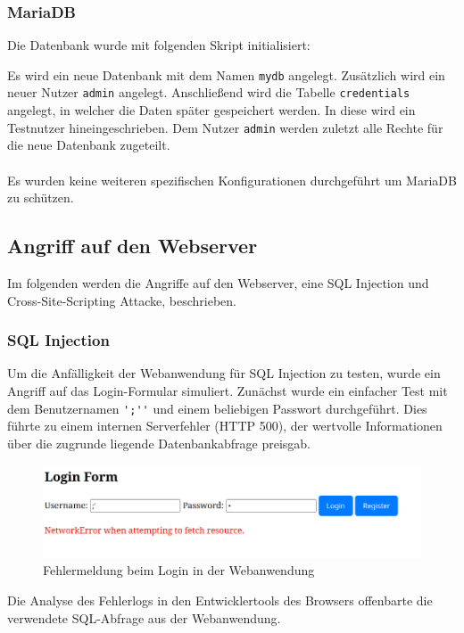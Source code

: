 \documentclass[
    a4paper,
    pagesize,
	pdftex,
    12pt,
]{scrartcl}
\begin{document}
\subsubsection{MariaDB}
Die Datenbank wurde mit folgenden Skript initialisiert:

Es wird ein neue Datenbank mit dem Namen \lstinline[breaklines]|mydb| angelegt. Zusätzlich wird ein neuer Nutzer \lstinline[breaklines]|admin| angelegt. Anschließend wird die Tabelle \lstinline[breaklines]|credentials| angelegt, in welcher die Daten später gespeichert werden. In diese wird ein Testnutzer hineingeschrieben. Dem Nutzer \lstinline[breaklines]|admin| werden zuletzt alle Rechte für die neue Datenbank zugeteilt. \\ \\
Es wurden keine weiteren spezifischen Konfigurationen durchgeführt um MariaDB zu schützen.

\subsection{Angriff auf den Webserver}
Im folgenden werden die Angriffe auf den Webserver, eine SQL Injection und Cross-Site-Scripting Attacke, beschrieben.

\subsubsection{SQL Injection}
Um die Anfälligkeit der Webanwendung für SQL Injection zu testen, wurde ein Angriff auf das Login-Formular simuliert. Zunächst wurde ein einfacher Test mit dem Benutzernamen \lstinline[breaklines]|';''| und einem beliebigen Passwort durchgeführt. Dies führte zu einem internen Serverfehler (HTTP 500), der wertvolle Informationen über die zugrunde liegende Datenbankabfrage preisgab.

\begin{figure}[H]
	\centering
	\includegraphics[width=15cm]{sql-login-error-message.png}
	\caption{Fehlermeldung beim Login in der Webanwendung}
	\label{fig:sql-login-error-message}
\end{figure}

\noindent Die Analyse des Fehlerlogs in den Entwicklertools des Browsers offenbarte die verwendete SQL-Abfrage aus der Webanwendung.
\end{document}
